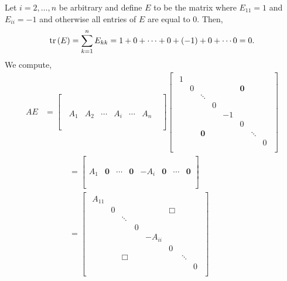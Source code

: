 \documentclass{article}
\begin{document}
Let $i = 2,\dots, n$ be arbitrary and define $E$ to be the matrix where $E_{11} = 1$ and $E_{ii} = -1$ and otherwise all entries of $E$ are equal to 0. Then, 
	\[ \text{tr}\left({E}\right) = \sum_{k=1}^n E_{kk} = 1 + 0 + \cdots + 0 + (-1) + 0 + \cdots 0 = 0.\]
We compute,
	\begin{align*} 
		AE & =  
		\begin{bmatrix}
			& \\\\
			& \\\\
			\;\;A_1 & A_2 & \cdots & A_i & \cdots & A_n
			& \\\\\\
			&
		\end{bmatrix}	 
		\begin{bmatrix}
			\begin{array}{cccccccc}
 				1 &   &   &   &   &   &   &   \\
 				  & 0 &   &   &   & \mathbf 0  &   &   \\
 				  &   & \ddots &   &   &   &   &   \\
				  &   &   & 0 &   &   &   &   \\
 				  &   &   &   & -1 &   &   &   \\
 				  &   &   &   &   & 0 &   &   \\
 				  &   &   \mathbf 0&   &   &   & \ddots &   \\
 				  &   &   &   &   &   &   & 0 \\
			\end{array}
		   \end{bmatrix}\\
		   & \quad \quad \quad = \begin{bmatrix} 
		   	& \\\\
			& \\
		   	A_1 & \mathbf 0 & \cdots & \mathbf 0  & -A_i & \mathbf 0 & \cdots & \mathbf 0\\
			& \\\\
			&
			\end{bmatrix}\\
		 & \quad \quad \quad = \begin{bmatrix} 
		 	\begin{array}{cccccccc}
 				A_{11} &   &   &   &   &   &   &   \\
 				  & 0 &   &   &   & \Box  &   &   \\
 				  &   & \ddots &   &   &   &   &   \\
				  &   &   & 0 &   &   &   &   \\
 				  &   &   &   & -A_{ii} &   &   &   \\
 				  &   &   &   &   & 0 &   &   \\
 				  &   &   \Box &   &   &   & \ddots &   \\
 				  &   &   &   &   &   &   & 0 \\
			\end{array}
		 \end{bmatrix}
	\end{align*}
\end{document}
